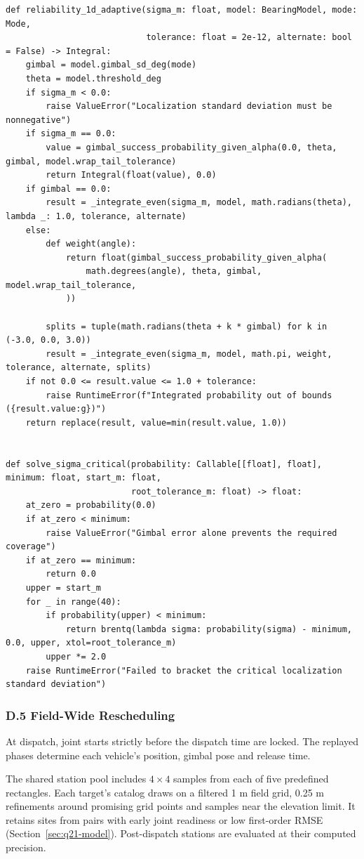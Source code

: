 \documentclass{swmcmthesis}
\begin{document}
\begin{lstlisting}
def reliability_1d_adaptive(sigma_m: float, model: BearingModel, mode: Mode,
                            tolerance: float = 2e-12, alternate: bool = False) -> Integral:
    gimbal = model.gimbal_sd_deg(mode)
    theta = model.threshold_deg
    if sigma_m < 0.0:
        raise ValueError("Localization standard deviation must be nonnegative")
    if sigma_m == 0.0:
        value = gimbal_success_probability_given_alpha(0.0, theta, gimbal, model.wrap_tail_tolerance)
        return Integral(float(value), 0.0)
    if gimbal == 0.0:
        result = _integrate_even(sigma_m, model, math.radians(theta), lambda _: 1.0, tolerance, alternate)
    else:
        def weight(angle):
            return float(gimbal_success_probability_given_alpha(
                math.degrees(angle), theta, gimbal, model.wrap_tail_tolerance,
            ))

        splits = tuple(math.radians(theta + k * gimbal) for k in (-3.0, 0.0, 3.0))
        result = _integrate_even(sigma_m, model, math.pi, weight, tolerance, alternate, splits)
    if not 0.0 <= result.value <= 1.0 + tolerance:
        raise RuntimeError(f"Integrated probability out of bounds ({result.value:g})")
    return replace(result, value=min(result.value, 1.0))


def solve_sigma_critical(probability: Callable[[float], float], minimum: float, start_m: float,
                         root_tolerance_m: float) -> float:
    at_zero = probability(0.0)
    if at_zero < minimum:
        raise ValueError("Gimbal error alone prevents the required coverage")
    if at_zero == minimum:
        return 0.0
    upper = start_m
    for _ in range(40):
        if probability(upper) < minimum:
            return brentq(lambda sigma: probability(sigma) - minimum, 0.0, upper, xtol=root_tolerance_m)
        upper *= 2.0
    raise RuntimeError("Failed to bracket the critical localization standard deviation")
\end{lstlisting}

\subsubsection*{D.5 Field-Wide Rescheduling}
\label{app:q4-search-settings}

At dispatch, joint starts strictly before the dispatch time are locked. The replayed phases determine each vehicle's position, gimbal pose and release time.

The shared station pool includes \(4\times4\) samples from each of five predefined rectangles. Each target's catalog draws on a filtered 1 m field grid, 0.25 m refinements around promising grid points and samples near the elevation limit. It retains sites from pairs with early joint readiness or low first-order RMSE (Section~\ref{sec:q21-model}). Post-dispatch stations are evaluated at their computed precision.
\end{document}
